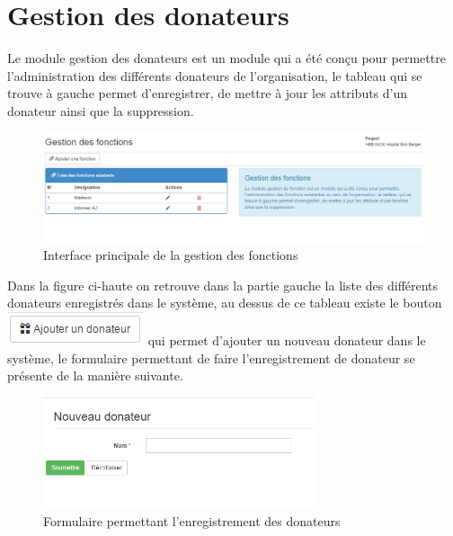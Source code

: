 \documentclass[12pt,a4paper]{report}
\begin{document}
\section{Gestion des donateurs}
Le module gestion des donateurs est un module qui a été conçu pour permettre l'administration des différents donateurs de l'organisation, le tableau qui se trouve à gauche permet d’enregistrer, de mettre à jour les attributs d'un donateur ainsi que la suppression.
\begin{figure}[h]
\begin{center}
\includegraphics[width=14cm]{pic/GestionFonction.png}
\end{center}
\caption{Interface principale de la gestion des fonctions}
\label{Interface principale de la gestion des fonctions}
\end{figure}

Dans la figure ci-haute on retrouve dans la partie gauche la liste des différents donateurs enregistrés dans le système, au dessus de ce tableau existe le bouton \includegraphics[scale=1]{pic/AddDonor.png} qui permet d'ajouter un nouveau donateur dans le système, le formulaire permettant de faire l'enregistrement de donateur se présente de la manière suivante.

\begin{figure}[h]
\begin{center}
\includegraphics[width=8cm]{pic/NewDonor.png}
\end{center}
\caption{Formulaire permettant l'enregistrement des donateurs}
\label{Formulaire permettant l'enregistrement des donateurs}
\end{figure} 
\end{document}
